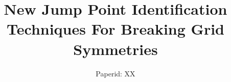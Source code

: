 \documentclass{article}
\begin{document}
\title{New Jump Point Identification Techniques For Breaking Grid Symmetries}
\author{Paperid: XX}

\maketitle










%



\end{document}
